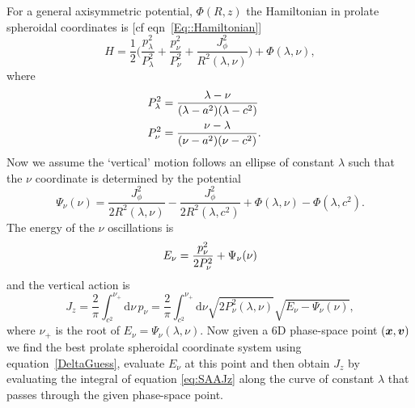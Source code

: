 \documentclass[useAMS,usenatbib,fleqn,a4paper]{mn2e}
\def\half{{\textstyle{\frac12}}}
\newcommand{\bs}[1]{\bmath{#1}}
\begin{document}
For a general axisymmetric potential, $\Phi(R,z)$ the Hamiltonian in prolate
spheroidal coordinates is [cf eqn~\ref{Eq::Hamiltonian}]
\begin{equation}
H = \half\Big(\frac{p_\lambda^2}{P_\lambda^2}+\frac{p_\nu^2}{P_\nu^2}
+\frac{J_\phi^2}{R^2(\lambda,\nu)}\Big)+\Phi(\lambda,\nu),
\end{equation}
where
\begin{equation}
\begin{split}
P_\lambda^2 &=\frac{\lambda-\nu}{(\lambda-a^2)(\lambda-c^2)}\cr
P_\nu^2 &=\frac{\nu-\lambda}{(\nu-a^2)(\nu-c^2)}.
\end{split}
\end{equation}
Now we assume the `vertical' motion follows an ellipse of constant
$\lambda$ such that the $\nu$ coordinate is determined by the
potential
\begin{equation}
\Psi_\nu(\nu) = \frac{J_\phi^2}{2R^2(\lambda,\nu)}
-\frac{J_\phi^2}{2R^2(\lambda,c^2)}+\Phi(\lambda,\nu)-\Phi(\lambda,c^2).
\end{equation}
The energy of the $\nu$ oscillations is
\begin{equation}
E_\nu = {p_\nu^2\over2P_\nu^2} + \Psi_\nu(\nu)
\end{equation}
and the vertical action is
\begin{equation}\label{eq:SAAJz}
J_z = \frac{2}{\pi}\int_{c^2}^{\nu_+}\mathrm{d}\nu\,p_\nu
= \frac{2}{\pi}\int_{c^2}^{\nu_+}\mathrm{d}\nu\sqrt{2P_\nu^2(\lambda,\nu)}\sqrt{E_\nu-\Psi_\nu(\nu)},
\end{equation}
where $\nu_+$ is the root of $E_\nu=\Psi_\nu(\lambda,\nu)$.  Now given a 6D
phase-space point $(\bs{x},\bs{v})$ we  find the best prolate spheroidal
coordinate system using equation~\eqref{DeltaGuess}, evaluate $E_\nu$ at this point and then obtain $J_z$
by evaluating the integral of equation \eqref{eq:SAAJz} along the curve of constant
$\lambda$ that passes through the given phase-space point.
\end{document}

